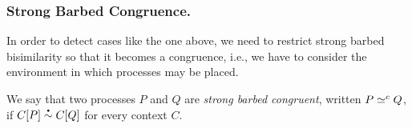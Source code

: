 




\subsubsection{Strong Barbed Congruence.}
In order to detect cases like the one above, we need to restrict strong barbed bisimilarity so that it becomes a congruence,
i.e., %
we have to consider the environment in which processes may be placed.

We say that two processes \( P \) and \( Q \) are \emph{strong barbed congruent}, written \( P \simeq^c Q \), if \( \sbbisim{\applyctx{C}{P}}{\applyctx{C}{Q}} \) for every context \( C \).

